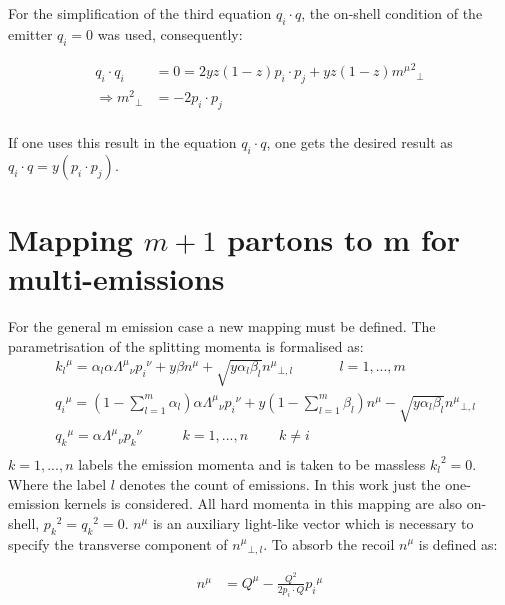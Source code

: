 For the simplification of the third equation $ q_i \cdot q  $, the on-shell condition of the emitter $ {q_i} = 0$ was used, consequently:

\begin{equation}
\begin{split}
q_i \cdot q_i &= 0 = 2yz(1-z)p_i \cdot p_j +yz(1-z){{m^{\mu}}^2}_{\bot}\\
\Rightarrow {{m}^2}_{\bot} &= -2p_i \cdot p_j\\
\end{split}
\end{equation}

If one uses this result in the equation $ q_i \cdot q $, one gets the desired result as $ q_i \cdot q = y(p_i \cdot p_j) $.

\section{Mapping $ m+1 $ partons to m for multi-emissions}
For the general m emission case a new mapping must be defined. The parametrisation of the splitting momenta is formalised as:
\begin{equation}
	\begin{split}
	&{k_l}^{\mu} = \alpha_l \alpha {\Lambda^{\mu}}_{\nu}{p_i}^{\nu} + y\beta{n}^{\mu} + \sqrt{y\alpha_l\beta_l}{n^{\mu}}_{\bot,l} \:\:\:\:\:\:\:\:\:\:\:\:\:\:\:{l=1,...,m} \\
	&{q_i}^{\mu}   = (1-\displaystyle\sum\limits_{l=1}^m \alpha_l) \alpha {\Lambda^{\mu}}_{\nu}{p_i}^{\nu} + y(1-\displaystyle\sum\limits_{l=1}^m \beta_l){n}^{\mu} - \sqrt{y\alpha_l\beta_l}{n^{\mu}}_{\bot,l} \\
	&{q_k}^{\mu} = \alpha {\Lambda^{\mu}}_{\nu}{p_k}^{\nu} \:\:\:\:\:\:\:\:\:\:\:\:\: {k=1,...,n}\:\:\:\:\:\:\:\:\:\:k\neq i\\
    \end{split}
\end{equation}
$ k = 1,...,n $ labels the emission momenta and is taken to be massless $ {k_l}^2 = 0 $. Where the label $ l $ denotes the count of emissions. In this work just the one-emission kernels is considered. All hard momenta in this mapping are also on-shell, $ {p_k}^2={q_k}^2=0 $.
$ n^{\mu} $ is an auxiliary light-like vector which is necessary to specify the transverse component of $ {n^{\mu}}_{\bot,l} $.
To absorb the recoil $ n^{\mu} $ is defined as:


\begin{equation}
\begin{split}
{n^{\mu}} &= Q^{\mu}-\frac{Q^2}{2p_i \cdot Q} {p_i}^{\mu}
\end{split}	
\end{equation}


